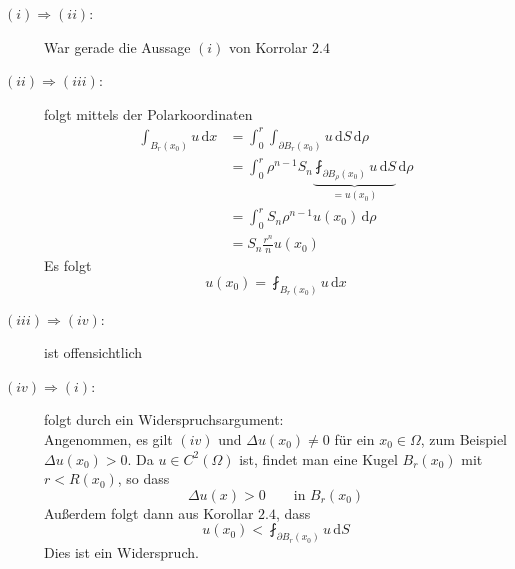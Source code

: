 \begin{beweis}
	\begin{description}
		\item[\underline{$(i) \Rightarrow (ii)$}:] War gerade die Aussage $(i)$ von Korrolar $2.4$
		\item[\underline{$(ii) \Rightarrow (iii)$}:] folgt mittels der Polarkoordinaten
		\begin{align*}
			\int_{B_r(x_0)}^{}u \,\mathrm{d}x &= \int_{0}^{r} \int_{\partial B_r(x_0)}^{} u \,\mathrm{d}S \,\mathrm{d}\rho  \\
			&= \int_{0}^{r} \rho^{n-1}S_n \underset{=u(x_0)}{\underbrace{\fint_{\partial B_{\rho}(x_0)}^{} u \,\mathrm{d}S}} \,\mathrm{d} \rho \\
			&= \int_{0}^{r}S_n \rho^{n-1} u(x_0)\,\mathrm{d}\rho \\
			&= S_n \frac{r^n}{n} u(x_0)
		\end{align*}
		Es folgt \[
			u(x_0) = \fint_{B_r(x_0)}^{} u \,\mathrm{d}x
		\]
		\item[\underline{$(iii) \Rightarrow (iv)$}:] ist offensichtlich
		\item[\underline{$(iv) \Rightarrow (i)$}:] folgt durch ein Widerspruchsargument: \\
		Angenommen, es gilt $(iv)$ und $\Delta u(x_0) \neq 0$ für ein $x_0 \in \Omega$, zum Beispiel $ \Delta u(x_0) > 0$. Da $u \in C^2(\Omega)$ ist, findet man eine Kugel $B_r(x_0)$ mit $r < R(x_0)$, so dass
		\[
			\Delta u(x) > 0 \qquad \text{in } B_r(x_0)
		\]
		Außerdem folgt dann aus Korollar $2.4$, dass 
		\[
			u(x_0)< \fint_{\partial B_r(x_0)}^{} u \,\mathrm{d}S
		\]
		Dies ist ein Widerspruch.
	\end{description}
\end{beweis}

